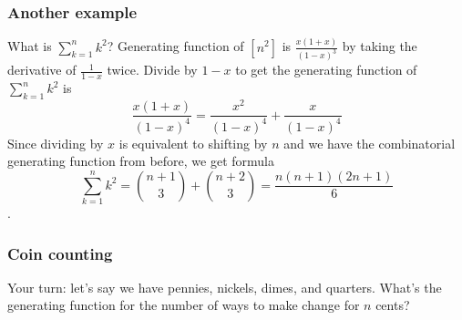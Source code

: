 \documentclass{beamer}
\begin{document}
\begin{frame}
    \frametitle{Another example}

    What is $\sum_{k=1}^{n} k^2$?
    \pause
    \quad
    \newline
    \newline
    Generating function of $[n^2]$ is $\frac{x(1 + x)}{(1 - x)^3}$ by taking the derivative of $\frac{1}{1 - x}$ twice.
    \pause
    \quad
    \newline
    \newline
    Divide by $1 - x$ to get the generating function of $\sum_{k=1}^{n} k^2$ is $$\frac{x(1 + x)}{(1 - x)^4} = \frac{x^2}{(1 - x)^4} + \frac{x}{(1 - x)^4}$$
    \pause
    Since dividing by $x$ is equivalent to shifting by $n$ and we have the combinatorial generating function from before, we get formula
    $$\sum_{k=1}^{n} k^2 = {n + 1 \choose 3} + {n + 2 \choose 3} = \frac{n(n + 1)(2n + 1)}{6}$$.


\end{frame}

\begin{frame}
    \frametitle{Coin counting}

    Your turn: let's say we have pennies, nickels, dimes, and quarters. What's the generating function for the number of ways to make change for $n$ cents?

\end{frame}
 
\end{document}
